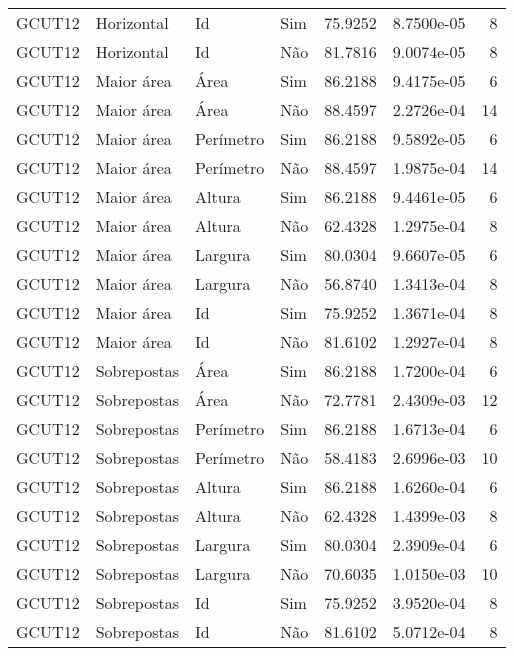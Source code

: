 \begin{tabular}{llllrrr}
    GCUT12    & Horizontal  & Id        & Sim         & 75.9252      & 8.7500e-05 & 8        \\
    GCUT12    & Horizontal  & Id        & Não         & 81.7816      & 9.0074e-05 & 8        \\
    GCUT12    & Maior área  & Área      & Sim         & 86.2188      & 9.4175e-05 & 6        \\
    GCUT12    & Maior área  & Área      & Não         & 88.4597      & 2.2726e-04 & 14       \\
    GCUT12    & Maior área  & Perímetro & Sim         & 86.2188      & 9.5892e-05 & 6        \\
    GCUT12    & Maior área  & Perímetro & Não         & 88.4597      & 1.9875e-04 & 14       \\
    GCUT12    & Maior área  & Altura    & Sim         & 86.2188      & 9.4461e-05 & 6        \\
    GCUT12    & Maior área  & Altura    & Não         & 62.4328      & 1.2975e-04 & 8        \\
    GCUT12    & Maior área  & Largura   & Sim         & 80.0304      & 9.6607e-05 & 6        \\
    GCUT12    & Maior área  & Largura   & Não         & 56.8740      & 1.3413e-04 & 8        \\
    GCUT12    & Maior área  & Id        & Sim         & 75.9252      & 1.3671e-04 & 8        \\
    GCUT12    & Maior área  & Id        & Não         & 81.6102      & 1.2927e-04 & 8        \\
    GCUT12    & Sobrepostas & Área      & Sim         & 86.2188      & 1.7200e-04 & 6        \\
    GCUT12    & Sobrepostas & Área      & Não         & 72.7781      & 2.4309e-03 & 12       \\
    GCUT12    & Sobrepostas & Perímetro & Sim         & 86.2188      & 1.6713e-04 & 6        \\
    GCUT12    & Sobrepostas & Perímetro & Não         & 58.4183      & 2.6996e-03 & 10       \\
    GCUT12    & Sobrepostas & Altura    & Sim         & 86.2188      & 1.6260e-04 & 6        \\
    GCUT12    & Sobrepostas & Altura    & Não         & 62.4328      & 1.4399e-03 & 8        \\
    GCUT12    & Sobrepostas & Largura   & Sim         & 80.0304      & 2.3909e-04 & 6        \\
    GCUT12    & Sobrepostas & Largura   & Não         & 70.6035      & 1.0150e-03 & 10       \\
    GCUT12    & Sobrepostas & Id        & Sim         & 75.9252      & 3.9520e-04 & 8        \\
    GCUT12    & Sobrepostas & Id        & Não         & 81.6102      & 5.0712e-04 & 8        \\
    \hline
\end{tabular}